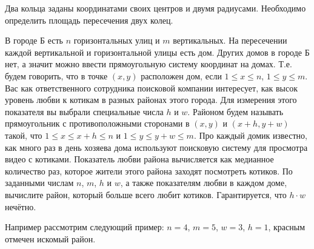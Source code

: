 \documentclass[addpoints]{exam}
\begin{document}
\begin{questions}

\question Два кольца заданы координатами своих центров и двумя радиусами. Необходимо определить площадь пересечения двух колец.

\question В городе Б есть $n$ горизонтальных улиц и $m$ вертикальных. На пересечении каждой вертикальной и горизонтальной улицы есть дом. Других домов в городе Б нет, а значит можно ввести прямоугольную систему координат на домах. Т.е. будем говорить, что в точке $(x,y)$ расположен дом, если $1 \leqslant x \leqslant n$, $1 \leqslant y \leqslant m$. Вас как ответственного сотрудника поисковой компании интересует, как высок уровень любви к котикам в разных районах этого города. Для измерения этого показателя вы выбрали специальные числа $h$ и $w$. Районом будем называть прямоугольник с противоположными сторонами в $(x,y)$ и $(x+h,y+w)$ такой, что $1 \leqslant x \leqslant x + h \leqslant n$ и $1 \leqslant y \leqslant y + w \leqslant m$. Про каждый домик известно, как много раз в день хозяева дома используют поисковую систему для просмотра видео с котиками. Показатель любви района вычисляется как медианное количество раз, которое жители этого района заходят посмотреть котиков. По заданными числам $n$, $m$, $h$ и $w$, а также показателям любви в каждом доме, вычислите район, который больше всего любит котиков. Гарантируется, что $h \cdot w$ нечётно.

Например рассмотрим следующий пример: $n=4$, $m=5$, $w=3$, $h=1$, красным отмечен искомый район.

\begin{center}
\end{center}


\end{questions}
\end{document}
